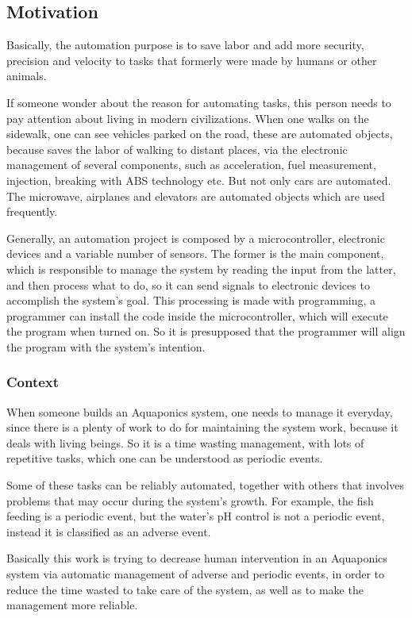 \subsection{Motivation}
Basically,
the automation purpose is to save labor and add more security,
precision and velocity to tasks that formerly were made by humans or other animals.

If someone wonder about the reason for automating tasks,
this person needs to pay attention about living in modern civilizations.
When one walks on the sidewalk,
one can see vehicles parked on the road,
these are automated objects,
because saves the labor of walking to distant places,
via the electronic management of several components,
such as acceleration,
fuel measurement,
injection,
breaking with ABS technology etc.
But not only cars are automated.
The microwave,
airplanes and elevators are automated objects which are used frequently.

Generally, 
an automation project is composed by a microcontroller, 
electronic devices and a variable number of sensors.
The former is the main component,
which is responsible to manage the system by reading the input from the latter,
and then process what to do,
so it can send signals to electronic devices to accomplish the system's goal.
This processing is made with programming,
a programmer can install the code inside the microcontroller,
which will execute the program when turned on.
So it is presupposed that the programmer will align the program with the system's intention.

\subsubsection{Context}
When someone builds an Aquaponics system,
one needs to manage it everyday,
since there is a plenty of work to do for maintaining the system work,
because it deals with living beings.
So it is a time wasting management,
with lots of repetitive tasks,
which one can be understood as periodic events.

Some of these tasks can be reliably automated,
together with others that involves problems that may occur during the system's growth.
For example, the fish feeding is a periodic event,
but the water's pH control is not a periodic event,
instead it is classified as an adverse event.

Basically this work is trying to decrease human intervention in an Aquaponics system via automatic management of adverse and periodic events,
in order to reduce the time wasted to take care of the system, 
as well as to make the management more reliable.

